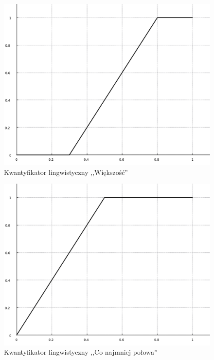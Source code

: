 \begin{figure}[ht]
  \includegraphics[width=\linewidth]
  	{chapters/fuzzylogic/fuzzy_most}
  \caption{Kwantyfikator lingwistyczny ,,Większość''}
  \label{fig:kwantyfikator_lingwistyczny_wiekszosc}
\end{figure}

\begin{figure}[ht]
  \includegraphics[width=\linewidth]
  	{chapters/fuzzylogic/fuzzy_half}
  \caption{Kwantyfikator lingwistyczny ,,Co najmniej połowa''}
  \label{fig:kwantyfikator_lingwistyczny_polowa}
\end{figure}

